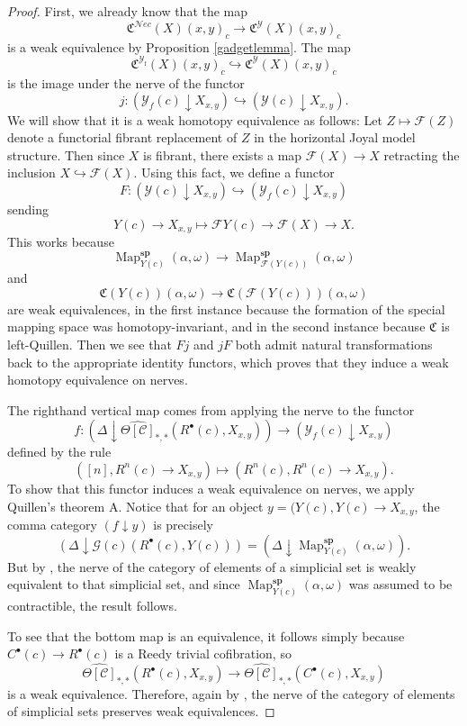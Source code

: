 \documentclass{amsart}
\numberwithin{equation}{section}
\theoremstyle{plain}   %
\theoremstyle{remark}
\theoremstyle{plain}
\newcommand{\Nec}{\ensuremath{{\mathcal{N}ec}}}
\newcommand{\overcat}[2]{{(#1\downarrow #2)}}
\DeclareMathOperator{\Map}{Map}
\newcommand{\cellset}{\ensuremath{\widehat{\Theta[\mathcal{C}]}}}
\begin{document}
\begin{proof}
	First, we already know that the map
	\[\mathfrak{C}^\Nec(X)(x,y)_c \to \mathfrak{C}^\mathcal{Y}(X)(x,y)_c\]
	is a weak equivalence by Proposition \ref{gadgetlemma}.  The map
	\[\mathfrak{C}^{\mathcal{Y}_\mathrm{f}}(X)(x,y)_c \hookrightarrow \mathfrak{C}^{\mathcal{Y}}(X)(x,y)_c\]
	is the image under the nerve of the functor
	\[j:\overcat{\mathcal{Y}_f(c)}{X_{x,y}} \hookrightarrow \overcat{\mathcal{Y}(c)}{X_{x,y}}.\]
	We will show that it is a weak homotopy equivalence as follows: Let \(Z\mapsto \mathscr{F}(Z)\) denote a functorial fibrant replacement of \(Z\) in the horizontal Joyal model structure. Then since \(X\) is fibrant, there exists a map \(\mathscr{F}(X)\to X\) retracting the inclusion \(X\hookrightarrow \mathscr{F}(X)\).  Using this fact, we define a functor
	\[F:\overcat{\mathcal{Y}(c)}{X_{x,y}} \hookrightarrow \overcat{\mathcal{Y}_f(c)}{X_{x,y}}\]
	sending \[Y(c)\to X_{x,y} \mapsto \mathscr{F}Y(c)\to \mathscr{F}(X) \to X.\]
	This works because
	\[\Map^\mathbf{sp}_{Y(c)}(\alpha,\omega)\to \Map^\mathbf{sp}_{\mathscr{F}(Y(c))}(\alpha,\omega)\]
	and
	\[\mathfrak{C}(Y(c))(\alpha,\omega)\to \mathfrak{C}(\mathscr{F}(Y(c)))(\alpha,\omega)\]
	are weak equivalences, in the first instance because the formation of the special mapping space was homotopy-invariant, and in the second instance because \(\mathfrak{C}\) is left-Quillen. Then we see that \(Fj\) and \(jF\) both admit natural transformations back to the appropriate identity functors, which proves that they induce a weak homotopy equivalence on nerves.

	The righthand vertical map comes from applying the nerve to the functor
	\[f:\overcat{\Delta}{\cellset_{\ast,\ast}(R^\bullet(c),X_{x,y})} \to \overcat{\mathcal{Y}_f(c)}{X_{x,y}}\]
	defined by the rule
	\[([n],R^n(c) \to X_{x,y}) \mapsto (R^n(c), R^n(c)\to X_{x,y}).\]
	To show that this functor induces a weak equivalence on nerves, we apply Quillen's theorem A.  Notice that for an object \(y=(Y(c),Y(c)\to X_{x,y}\), the comma category \(\overcat{f}{y}\) is precisely
	\[\overcat{\Delta}{\mathcal{G}(c)(R^\bullet(c),Y(c))}=\overcat{\Delta}{\Map^\mathbf{sp}_{Y(c)}(\alpha,\omega)}.\]
	But by \cite{ds2}, the nerve of the category of elements of a simplicial set is weakly equivalent to that simplicial set, and since \(\Map^\mathbf{sp}_{Y(c)}(\alpha,\omega)\) was assumed to be contractible, the result follows.

	To see that the bottom map is an equivalence, it follows simply because \(C^\bullet(c) \to R^\bullet(c)\) is a Reedy trivial cofibration, so
	\[\cellset_{\ast,\ast}(R^\bullet(c),X_{x,y})  \to \cellset_{\ast,\ast}(C^\bullet(c),X_{x,y})\]
	is a weak equivalence.  Therefore, again by \cite{ds2}, the nerve of the category of elements of simplicial sets preserves weak equivalences.
\end{proof}
\end{document}
